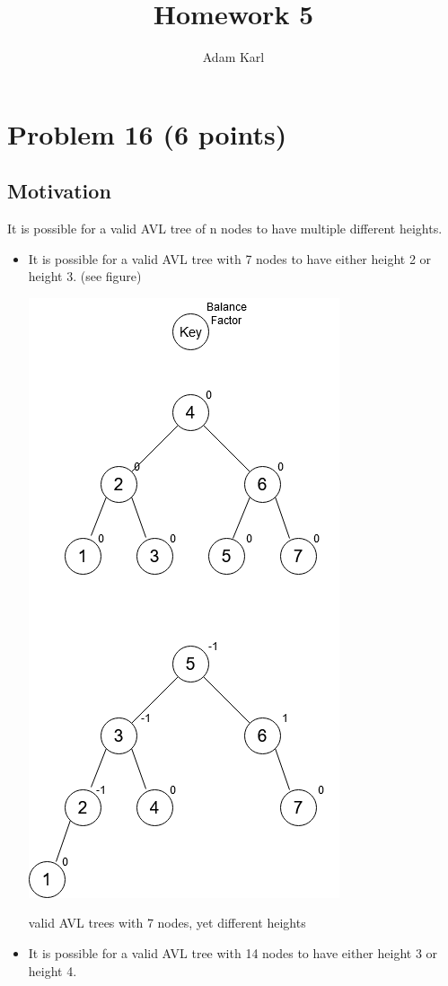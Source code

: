 \documentclass[a4paper]{article}
\title{Homework 5}
\author{Adam Karl}
\begin{document}
\maketitle

\section{Problem 16 (6 points)}
\subsection{Motivation}
It is possible for a valid AVL tree of n nodes to have multiple different heights.
\begin{itemize}
    \item It is possible for a valid AVL tree with 7 nodes to have either height 2 or height 3. (see figure)
    
\begin{center}
    \includegraphics[scale=0.5]{7AVL.png}
    
    \caption{valid AVL trees with 7 nodes, yet different heights}
\end{center}

    \item It is possible for a valid AVL tree with 14 nodes to have either height 3 or height 4. 
\end{itemize}
\end{document}
